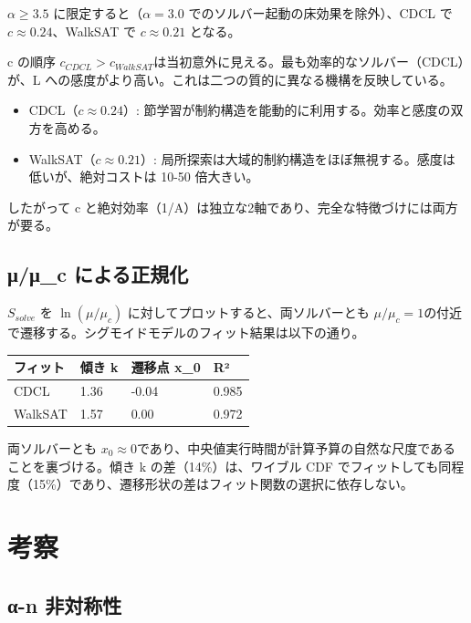 \documentclass[12pt,a4paper]{article}
\begin{document}
\(\alpha \ge 3.5\) に限定すると（\(\alpha = 3.0\) でのソルバー起動の床効果を除外）、CDCL で \(c \approx 0.24\)、WalkSAT で \(c \approx 0.21\) となる。

c の順序 \(c_{CDCL} > c_{WalkSAT}\)は当初意外に見える。最も効率的なソルバー（CDCL）が、L への感度がより高い。これは二つの質的に異なる機構を反映している。

\begin{itemize}
\tightlist
\item
  CDCL（\(c \approx 0.24\)）: 節学習が制約構造を能動的に利用する。効率と感度の双方を高める。
\item
  WalkSAT（\(c \approx 0.21\)）: 局所探索は大域的制約構造をほぼ無視する。感度は低いが、絶対コストは 10-50 倍大きい。
\end{itemize}

したがって c と絶対効率（1/A）は独立な2軸であり、完全な特徴づけには両方が要る。

\subsection{μ/μ\_c による正規化}\label{ux3bcux3bc_c-ux306bux3088ux308bux6b63ux898fux5316}

\(S_{solve}\) を \(\ln(\mu/\mu_{c})\) に対してプロットすると、両ソルバーとも \(\mu/\mu_{c} = 1\)の付近で遷移する。シグモイドモデルのフィット結果は以下の通り。

{\def\LTcaptype{table} %
\begin{longtable}[]{@{}llll@{}}
\toprule\noalign{}
フィット & 傾き k & 遷移点 x\_0 & R² \\
\midrule\noalign{}
\endhead
\bottomrule\noalign{}
\endlastfoot
CDCL & 1.36 & -0.04 & 0.985 \\
WalkSAT & 1.57 & 0.00 & 0.972 \\
\end{longtable}
}

両ソルバーとも \(x_0 ≈ 0\)であり、中央値実行時間が計算予算の自然な尺度であることを裏づける。傾き k の差（14\%）は、ワイブル CDF でフィットしても同程度（15\%）であり、遷移形状の差はフィット関数の選択に依存しない。

\section{考察}\label{ux8003ux5bdf}

\subsection{α-n 非対称性}\label{ux3b1-n-ux975eux5bfeux79f0ux6027}
\end{document}
